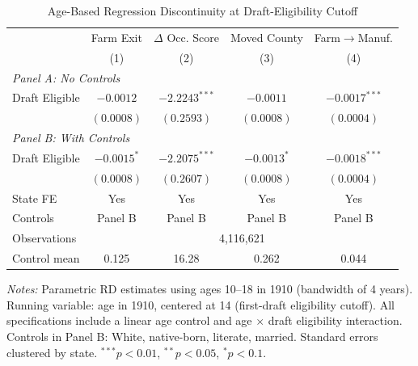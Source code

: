 \begin{table}[t]
\centering
\begin{threeparttable}
\caption{Age-Based Regression Discontinuity at Draft-Eligibility Cutoff}
\label{tab:age_rd}
\begin{tabular}{lcccc}
\hline\hline
 & Farm Exit & $\Delta$ Occ. Score & Moved County & Farm$\to$Manuf. \\
 & (1) & (2) & (3) & (4) \\
\hline
\multicolumn{5}{l}{\textit{Panel A: No Controls}} \\
Draft Eligible & $-0.0012$ & $-2.2243^{***}$ & $-0.0011$ & $-0.0017^{***}$ \\
 & $(0.0008)$ & $(0.2593)$ & $(0.0008)$ & $(0.0004)$ \\
\hline
\multicolumn{5}{l}{\textit{Panel B: With Controls}} \\
Draft Eligible & $-0.0015^{*}$ & $-2.2075^{***}$ & $-0.0013^{*}$ & $-0.0018^{***}$ \\
 & $(0.0008)$ & $(0.2607)$ & $(0.0008)$ & $(0.0004)$ \\
\hline
State FE & Yes & Yes & Yes & Yes \\
Controls & Panel B & Panel B & Panel B & Panel B \\
Observations & \multicolumn{4}{c}{4,116,621} \\
Control mean & 0.125 & 16.28 & 0.262 & 0.044 \\
\hline\hline
\end{tabular}
\begin{tablenotes}[flushleft]\small
\item \textit{Notes:} Parametric RD estimates using ages 10--18 in 1910 (bandwidth of 4 years). Running variable: age in 1910, centered at 14 (first-draft eligibility cutoff). All specifications include a linear age control and age $\times$ draft eligibility interaction. Controls in Panel B: White, native-born, literate, married. Standard errors clustered by state. $^{***}p<0.01$, $^{**}p<0.05$, $^{*}p<0.1$.
\end{tablenotes}
\end{threeparttable}
\end{table}

